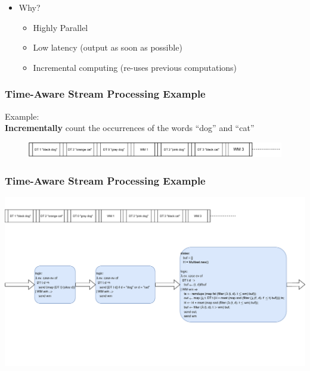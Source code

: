 \documentclass[aspectratio=169,10pt]{beamer}
\begin{document}
\begin{frame}[fragile]
\begin{itemize}
\begin{overlayarea}{\textwidth}{.1\textheight}
\begin{figure}
              \centering
            \end{figure}
          \end{overlayarea}
          \vspace*{-1ex}
          \pause
    \item Why?
          \begin{itemize}
            \item Highly Parallel
            \item Low latency (output as soon as possible)
            \item Incremental computing (re-uses previous computations)
          \end{itemize}
  \end{itemize}
\end{frame}

\begin{frame}[fragile]
  \frametitle{Time-Aware Stream Processing Example}
  Example:\\
  \textbf{Incrementally} count the occurrences of the words ``dog'' and ``cat''
  \begin{figure}
    \centering
    \includegraphics[width=.75\textwidth]{stream_ex1.pdf}
  \end{figure}
\end{frame}

\begin{frame}[fragile]
  \frametitle{Time-Aware Stream Processing Example}
    \includegraphics[page=1,width=.95\textwidth]{dataflow_ex1.pdf}
\end{frame}
\end{document}

